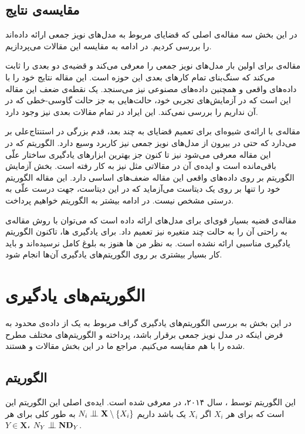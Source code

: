 \documentclass[a4paper,12pt]{article}
\newcommand{\bigCI}{\mathrel{\text{\scalebox{1.07}{$\perp\mkern-10mu\perp$}}}}
\begin{document}
\subsection{مقایسه‌ی نتایج}
در این بخش سه مقاله‌ی اصلی که قضایای 
مربوط به مدل‌های نویز جمعی ارائه داده‌اند را بررسی کردیم. در ادامه به مقایسه این مقالات می‌پردازیم.


مقاله‌ی 
برای اولین بار مدل‌های نویز جمعی را معرفی می‌کند و قضیه‌ی 
دو بعدی را ثابت می‌کند که سنگ‌بنای تمام کار‌های بعدی این حوزه است. این مقاله نتایج خود را با داده‌‌های واقعی و همچنین داده‌های مصنوعی نیز می‌سنجد. یک نقطه‌ی ضعف این مقاله این است که در آزمایش‌های تجربی خود، حالت‌هایی به جز حالت گاوسی-خطی که در آن 
نداریم را بررسی نمی‌کند. این ایراد در تمام مقالات بعدی نیز وجود دارد.

مقاله‌ی 
با ارائه‌ی شیوه‌ای برای تعمیم قضایای 
به چند بعد، قدم بزرگی در استنتاج‌علی بر می‌دارد که حتی در بیرون از مدل‌های نویز جمعی نیز کاربرد وسیع دارد. الگوریتم 
که در این مقاله معرفی ‌می‌شود نیز تا کنون جز بهترین ابزارهای یادگیری ساختار علّی باقی‌مانده است و ایده‌ی آن در مقالاتی مثل 
\cite{time}
نیز به کار رفته است. بخش آزمایش‌ الگوریتم بر روی داده‌های واقعی این مقاله ضعف‌های اساسی دارد. این مقاله الگوریتم خود را تنها بر روی یک دیتاست می‌آزماید که در این دیتاست، جهت درست علّی به درستی مشخص نیست. در ادامه بیشتر به الگوریتم 
خواهیم پرداخت.

مقاله‌ی 
قضیه  
بسیار قوی‌ای برای مدل‌های 
ارائه داده است که می‌توان با روش مقاله‌ی 
\cite{continous}
به راحتی آن را به حالت چند متغیره نیز تعمیم داد. برای یادگیری
ها، تاکنون الگوریتم یادگیری مناسبی ارائه نشده است. به نظر من 
ها هنوز به بلوغ کامل نرسیده‌اند و باید کار بسیار بیشتری بر روی الگوریتم‌های یادگیری آن‌ها انجام شود.
\section{الگوریتم‌های یادگیری}

در این بخش به بررسی الگوریتم‌های یادگیری گراف مربوط به یک 
از داده‌ی محدود به فرض اینکه  در
مدل نویز جمعی برقرار باشد، پرداخته و الگوریتم‌های مختلف مطرح شده را با هم مقایسه می‌کنیم. مراجع ما در این بخش مقالات 
\cite{continous}
و 
\cite{nowzohour}
هستند.
\subsection{الگوریتم 
}
این الگوریتم توسط 
،
سال ۲۰۱۴، در
\cite{continous}
معرفی شده است. ایده‌ی اصلی این الگوریتم این است که برای هر $X_i$ اگر $X_i$ یک
باشد داریم
$N_i \bigCI \mathbf{X} \setminus \{X_i\}$
به طور کلی برای هر 
$Y \in \mathbf{X}$،
$N_Y \bigCI \mathbf{ND}_Y$.
\end{document}
